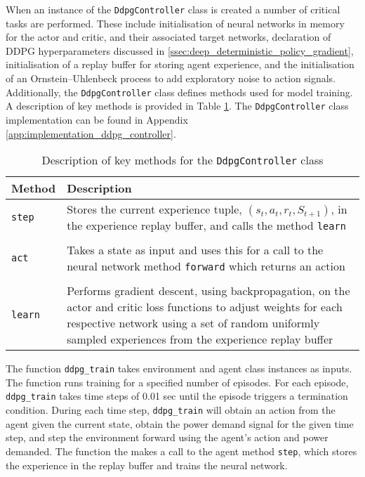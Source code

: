 When an instance of the \verb|DdpgController| class is created a number of critical tasks are performed. These include initialisation of neural networks in memory for the actor and critic, and their associated target networks, declaration of DDPG hyperparameters discussed in \textsection \ref{ssec:deep_deterministic_policy_gradient}, initialisation of a replay buffer for storing agent experience, and the initialisation of an Ornstein–Uhlenbeck process to add exploratory noise to action signals. Additionally, the \verb|DdpgController| class defines methods used for model training. A description of key methods is provided in Table \ref{tab:4103}. The \verb|DdpgController| class implementation can be found in Appendix \ref{app:implementation_ddpg_controller}.

\begin{table}[h]
	\centering
	\cprotect\caption{Description of key methods for the \verb|DdpgController| class}
	\begin{tabular}{lp{12cm}}
		\toprule
		\textbf{Method} & \textbf{Description} \\
		\midrule
		\verb|step| & Stores the current experience tuple, $(s_t, a_t, r_t, S_{t+1})$, in the experience replay buffer, and calls the method \verb|learn|\\
		 & \\
		\verb|act| & Takes a state as input and uses this for a call to the neural network method \verb|forward| which returns an action\\
		 & \\
		\verb|learn| & Performs gradient descent, using backpropagation, on the actor and critic loss functions to adjust weights for each respective network using a set of random uniformly sampled experiences from the experience replay buffer\\
		\bottomrule
	\end{tabular}\label{tab:4103}
\end{table} 

The function \verb|ddpg_train| takes environment and agent class instances as inputs. The function runs training for a specified number of episodes. For each episode, \verb|ddpg_train| takes time steps of 0.01 sec until the episode triggers a termination condition. During each time step, \verb|ddpg_train| will obtain an action from the agent given the current state, obtain the power demand signal for the given time step, and step the environment forward using the agent's action and power demanded. The function the makes a call to the agent method \verb|step|, which stores the experience in the replay buffer and trains the neural network.